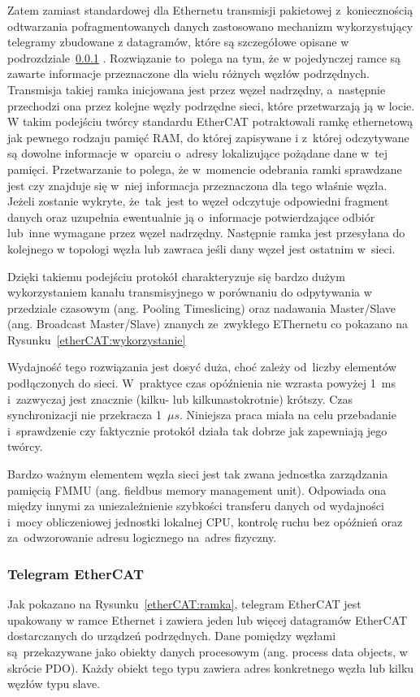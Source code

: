Zatem zamiast standardowej dla Ethernetu transmisji pakietowej z~koniecznością odtwarzania pofragmentowanych danych zastosowano mechanizm wykorzystujący telegramy zbudowane z datagramów, które są szczegółowe opisane w podrozdziale~\ref{subsec:telegram} .
Rozwiązanie to~polega na tym, że w pojedynczej ramce są zawarte informacje przeznaczone dla wielu różnych węzłów podrzędnych. Transmisja takiej ramka inicjowana jest przez węzeł nadrzędny, a~następnie przechodzi ona przez kolejne węzły podrzędne sieci, które przetwarzają ją w locie. W takim podejściu twórcy standardu EtherCAT potraktowali ramkę ethernetową jak pewnego rodzaju pamięć RAM, do której zapisywane i z~której odczytywane są dowolne informacje w~oparciu o~adresy lokalizujące pożądane dane w~tej pamięci.
Przetwarzanie to polega, że w~momencie odebrania ramki sprawdzane jest czy znajduje się w~niej informacja przeznaczona dla tego właśnie węzła. Jeżeli zostanie wykryte, że~tak~jest  to węzeł odczytuje odpowiedni fragment danych oraz uzupełnia ewentualnie ją o~informacje potwierdzające odbiór lub~inne wymagane przez węzeł nadrzędny. Następnie ramka jest przesyłana do kolejnego w topologi węzła lub zawraca jeśli dany węzeł jest ostatnim w~sieci. 

Dzięki takiemu podejściu protokół charakteryzuje się bardzo dużym wykorzystaniem kanału transmisyjnego w porównaniu do odpytywania w przedziale czasowym (ang. Pooling Timeslicing) oraz nadawania Master/Slave (ang. Broadcast Master/Slave) znanych ze~zwykłego EThernetu co pokazano na Rysunku~\ref{etherCAT:wykorzystanie}


Wydajność tego rozwiązania jest dosyć duża, choć zależy od~liczby elementów podłączonych do sieci. W~praktyce czas opóźnienia nie wzrasta powyżej 1~ms i~zazwyczaj jest znacznie (kilku- lub kilkunastokrotnie) krótszy. Czas synchronizacji nie przekracza 1~$\mu s$. Niniejsza praca miała na celu przebadanie i~sprawdzenie czy faktycznie protokół działa tak dobrze jak zapewniają jego twórcy.

Bardzo ważnym elementem węzła sieci jest tak zwana jednostka zarządzania pamięcią FMMU (ang. fieldbus memory management unit). Odpowiada ona między innymi za uniezależnienie szybkości transferu danych od wydajności i~mocy obliczeniowej jednostki lokalnej CPU, kontrolę ruchu bez opóźnień oraz za~odwzorowanie adresu logicznego na~adres fizyczny.

\subsubsection{Telegram EtherCAT}
\label{subsec:telegram}
Jak pokazano na Rysunku~\ref{etherCAT:ramka}, telegram EtherCAT jest upakowany w  ramce Ethernet i  zawiera jeden lub więcej datagramów EtherCAT dostarczanych do urządzeń podrzędnych. Dane pomiędzy węzłami są~przekazywane jako obiekty danych procesowym (ang. process data objects, w skrócie PDO). Każdy obiekt tego typu zawiera adres konkretnego węzła lub kilku węzłów typu slave.

